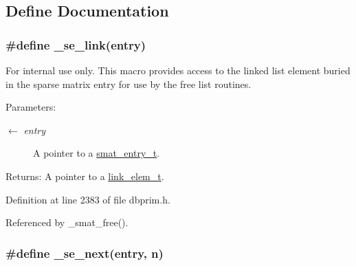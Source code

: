 \subsection{Define Documentation}
\hypertarget{group__dbprim__smat_ga57}{
\subsubsection[\_\-se\_\-link]{\setlength{\rightskip}{0pt plus 5cm}\#define \_\-se\_\-link(entry)}}
\label{group__dbprim__smat_ga57}


\begin{Desc}
\item[For internal use only.]
This macro provides access to the linked list element buried in the sparse matrix entry for use by the free list routines.

\begin{Desc}
\item[Parameters:]
\begin{description}
\item[\mbox{$\leftarrow$} {\em entry}]A pointer to a \hyperlink{group__dbprim__smat_ga2}{smat\_\-entry\_\-t}.\end{description}
\end{Desc}
\begin{Desc}
\item[Returns:]A pointer to a \hyperlink{group__dbprim__link_ga1}{link\_\-elem\_\-t}.\end{Desc}
\end{Desc}


Definition at line 2383 of file dbprim.h.

Referenced by \_\-smat\_\-free().\hypertarget{group__dbprim__smat_ga60}{
\subsubsection[\_\-se\_\-next]{\setlength{\rightskip}{0pt plus 5cm}\#define \_\-se\_\-next(entry, n)}}
\label{group__dbprim__smat_ga60}


